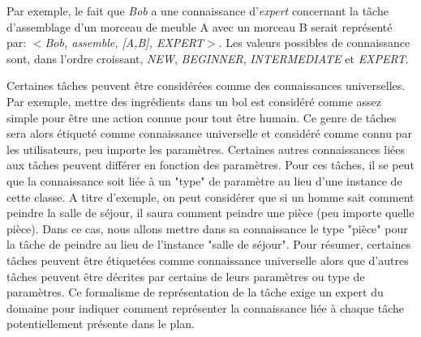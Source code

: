 \documentclass[a4paper,11pt,twoside]{StyleThese}
\begin{document}

%
Par exemple, le fait que \textit{Bob} a une connaissance d'\textit{expert} concernant la tâche d'assemblage d'un morceau de meuble A avec un morceau B serait représenté par:
\textit{$<$Bob, assemble, [A,B], EXPERT$>$}.
Les valeurs possibles de connaissance sont, dans l'ordre croissant, \textit{NEW}, \textit{BEGINNER}, \textit{INTERMEDIATE} et \textit{EXPERT}. 

Certaines tâches peuvent être considérées comme des connaissances universelles. Par exemple, mettre des ingrédients dans un bol est considéré comme assez simple pour être une action connue pour tout être humain. Ce genre de tâches sera alors étiqueté comme connaissance universelle et considéré comme connu par les utilisateurs, peu importe les paramètres. Certaines autres connaissances liées aux tâches peuvent différer en fonction des paramètres. Pour ces tâches, il se peut que la connaissance soit liée à un "type" de paramètre au lieu d'une instance de cette classe.
A titre d'exemple, on peut considérer que si un homme sait comment peindre la salle de séjour, il saura comment peindre une pièce (peu importe quelle pièce). Dans ce cas, nous allons mettre dans sa connaissance le type "pièce" pour la tâche de peindre au lieu de l'instance "salle de séjour".
Pour résumer, certaines tâches peuvent être étiquetées comme connaissance universelle alors que d'autres tâches peuvent être décrites par certains de leurs paramètres ou type de paramètres.
Ce formalisme de représentation de la tâche exige un expert du domaine pour indiquer comment représenter la connaissance liée à chaque tâche potentiellement présente dans le plan.

\end{document}

